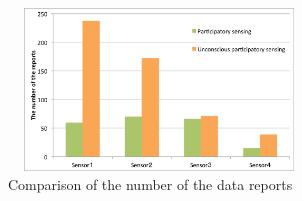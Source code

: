 \documentclass[submit,techrep]{ipsj}
\def\|{\verb|}
\begin{document}
%シミュレーション結果は参加型センシングの場合，各センシングポイントでほぼ均等にデータの取得が可能
%無意識参加型センシングの場合，道幅の広い道や交差点など人通りの多い付近のセンシングポイントでは参加型センシング
%よりも多くデータ収集する事が可能であるが，人通りの少ない場所ではセンシングポイントに参加者が移動しないためデータ収集量が少なくなる．
%従って，僻地や人通りの少ない場所においてセンシングポイントが存在した場合，参加型センシングの方がセンシングデータの多く収集可能であり，人通りの少ない場所においてセンシング情報を収集場合には参加型センシング方が有効である事が確認できた．一方で，大通に近いセンシングポイントや人通りが多い場所でのセンシングポイントでは無意識型センシングにおいてセンシング情報が多く収集できる事が確認できた．

\begin{figure}[t]
 \begin{center}
  \includegraphics[keepaspectratio, width=80mm,height=43mm]{Result.eps}
 \end{center}
 \caption{Comparison of the number of the data reports}
 \label{Result}
\end{figure}


%\label{config}

%ファイルは次のようになる．下線部は投稿時に省略可能なもの．またトランザク
%ション特有コマンドについては \ref{sig}~節を参照されたい．

%4.1
%\subsection{オプション・スタイル}

%\label{option} \|\documentclass{ipsj}|のオプション\footnote{研究会用のオ


\end{document}
